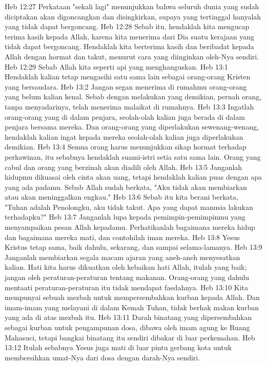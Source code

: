 Heb 12:27  Perkataan "sekali lagi" menunjukkan bahwa seluruh dunia yang sudah diciptakan akan digoncangkan dan disingkirkan, supaya yang tertinggal hanyalah yang tidak dapat bergoncang.
Heb 12:28  Sebab itu, hendaklah kita mengucap terima kasih kepada Allah, karena kita menerima dari Dia suatu kerajaan yang tidak dapat bergoncang. Hendaklah kita berterima kasih dan beribadat kepada Allah dengan hormat dan takut, menurut cara yang diinginkan oleh-Nya sendiri.
Heb 12:29  Sebab Allah kita seperti api yang menghanguskan.
Heb 13:1  Hendaklah kalian tetap mengasihi satu sama lain sebagai orang-orang Kristen yang bersaudara.
Heb 13:2  Jangan segan menerima di rumahmu orang-orang yang belum kalian kenal. Sebab dengan melakukan yang demikian, pernah orang, tanpa menyadarinya, telah menerima malaikat di rumahnya.
Heb 13:3  Ingatlah orang-orang yang di dalam penjara, seolah-olah kalian juga berada di dalam penjara bersama mereka. Dan orang-orang yang diperlakukan sewenang-wenang, hendaklah kalian ingat kepada mereka seolah-olah kalian juga diperlakukan demikian.
Heb 13:4  Semua orang harus menunjukkan sikap hormat terhadap perkawinan, itu sebabnya hendaklah suami-istri setia satu sama lain. Orang yang cabul dan orang yang berzinah akan diadili oleh Allah.
Heb 13:5  Janganlah hidupmu dikuasai oleh cinta akan uang, tetapi hendaklah kalian puas dengan apa yang ada padamu. Sebab Allah sudah berkata, "Aku tidak akan membiarkan atau akan meninggalkan engkau."
Heb 13:6  Sebab itu kita berani berkata, "Tuhan adalah Penolongku, aku tidak takut. Apa yang dapat manusia lakukan terhadapku?"
Heb 13:7  Janganlah lupa kepada pemimpin-pemimpinmu yang menyampaikan pesan Allah kepadamu. Perhatikanlah bagaimana mereka hidup dan bagaimana mereka mati, dan contohilah iman mereka.
Heb 13:8  Yesus Kristus tetap sama, baik dahulu, sekarang, dan sampai selama-lamanya.
Heb 13:9  Janganlah membiarkan segala macam ajaran yang aneh-aneh menyesatkan kalian. Hati kita harus dikuatkan oleh kebaikan hati Allah, itulah yang baik; jangan oleh peraturan-peraturan tentang makanan. Orang-orang yang dahulu mentaati peraturan-peraturan itu tidak mendapat faedahnya.
Heb 13:10  Kita mempunyai sebuah mezbah untuk mempersembahkan kurban kepada Allah. Dan imam-imam yang melayani di dalam Kemah Tuhan, tidak berhak makan kurban yang ada di atas mezbah itu.
Heb 13:11  Darah binatang yang dipersembahkan sebagai kurban untuk pengampunan dosa, dibawa oleh imam agung ke Ruang Mahasuci, tetapi bangkai binatang itu sendiri dibakar di luar perkemahan.
Heb 13:12  Itulah sebabnya Yesus juga mati di luar pintu gerbang kota untuk membersihkan umat-Nya dari dosa dengan darah-Nya sendiri.
